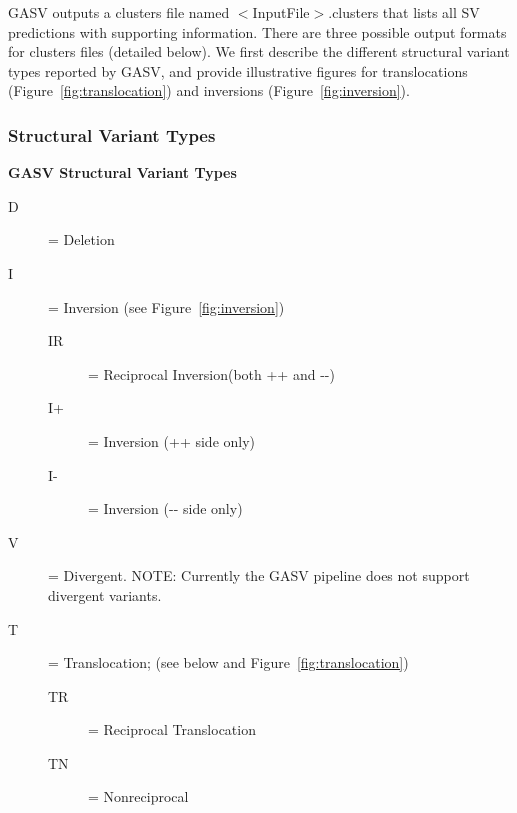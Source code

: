 \documentclass[11pt]{article}
\begin{document}
GASV outputs a clusters file named $<$InputFile$>$.clusters that lists all SV predictions with supporting information. There are three possible output formats for clusters files (detailed below).  We first describe the different structural variant types reported by GASV, and provide illustrative figures for translocations (Figure~\ref{fig:translocation}) and inversions (Figure~\ref{fig:inversion}).

\subsubsection{Structural Variant Types}
\label{sec:SVTypes}

\begin{framed}
\begin{center} \textbf{GASV Structural Variant Types} \end{center}
\begin{description}
\item[D] =     Deletion
\item[I] =    Inversion  (see Figure~\ref{fig:inversion})
\begin{description}
\item[IR] = Reciprocal Inversion(both ++ and -{}-)
\item[I+] =    Inversion (++ side only)
\item[I-] =    Inversion (-{}- side only)
\end{description}
\item[V] =    Divergent. {\scriptsize NOTE: Currently the GASV pipeline does not support divergent variants.}
\item[T] = Translocation; (see below and Figure~\ref{fig:translocation})
\begin{description}
\item[TR] = Reciprocal Translocation
\item[TN] = Nonreciprocal 
\end{description}
\end{description}
\end{framed}
\label{structvartypes}
\end{document}

